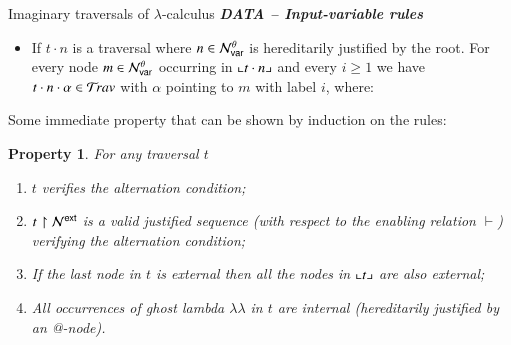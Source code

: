 \documentclass{elsarticle}
\theoremstyle{plain}
\newtheorem{property}[theorem]{Property}
\theoremstyle{definition}
\theoremstyle{remark}
\newcommand\Nodes{\mathcal{N}}%
\newcommand\NodesVar{\Nodes_{\sf var}}%
\newcommand{\ghostlmd}{{\lambda\!\!\lambda}}
\newcommand{\ghostvar}{\theta}
\newcommand\ImNodesVar{\NodesVar^\ghostvar}
\newcommand{\travulc}{\travset}
\newcommand{\enables}{\vdash} %
\newcommand{\ExtNodes}{\Nodes^{\sf ext}}
\begin{document}
\begin{table}
\begin{ruletablebox}{Imaginary traversals of $\lambda$-calculus}
\emph{\bf DATA -- Input-variable rules}
\begin{itemize}[leftmargin=3em]
\item[\rulenamet{IVar}] If $t \cdot n$ is a traversal where $n \in \ImNodesVar$ is hereditarily justified by the root. For every node $m \in \ImNodesVar$ occurring in $\llcorner t\cdot n \lrcorner$
and every $i\geq1$ we have $t \cdot n \cdot\alpha\in\travulc$ with $\alpha$ pointing to $m$ with label $i$, where:
\end{itemize}


\caption{Imaginary traversals $\travulc$ of the untyped lambda calculus.}
 \label{tab:trav_rules}
\end{ruletablebox}
\end{table}

Some immediate property that can be shown by induction on the rules:
\begin{property}
    \label{prop:trav_immediate}
   For any traversal $t$
   \begin{enumerate}[nosep]
   \item $t$ verifies the alternation condition;
   \item $t\filter\ExtNodes$ is a valid justified sequence (with respect to the enabling relation $\enables$) verifying the alternation condition;
   \item If the last node in $t$ is external then all the nodes in $\llcorner t \lrcorner$ are also external;
   \item All occurrences of ghost lambda $\ghostlmd$ in $t$ are internal (hereditarily justified by an @-node).
   \end{enumerate}
\end{property}
\end{document}
